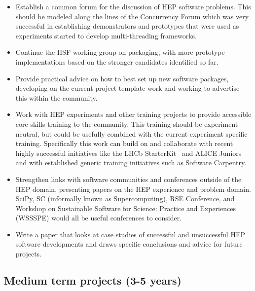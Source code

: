 \documentclass[12pt,a4paper]{article}
\begin{document}
\begin{itemize}
\item
    Establish a common forum for the discussion of HEP software problems.
  This should be modeled along the lines of the Concurrency Forum
  which was very successful in establishing demonstrators and prototypes
  that were used as experiments started to develop multi-threading
  frameworks.
  \item
  Continue the HSF working group on packaging, with more prototype
  implementations based on the stronger candidates identified so far.
  \item
    Provide practical advice on how to best set up new software packages,
  developing on the current project template work and working to
  advertise this within the community.
  \item
    Work with HEP experiments and other training projects to provide
  accessible core skills training to the community. This training should
  be experiment neutral, but could be usefully combined with the current
  experiment specific training. Specifically this work can build on and
  collaborate with recent highly successful initiatives like the LHCb
  StarterKit~\cite{1742-6596-898-8-082054} and ALICE Juniors~\cite{ALICEJuniors}
  and with established generic training initiatives such as Software Carpentry.
  \item
    Strengthen links with software communities and conferences outside of
  the HEP domain, presenting papers on the HEP experience and problem
  domain. SciPy, SC (informally known as Supercomputing), RSE
  Conference, and Workshop on Sustainable Software for Science: Practice
  and Experiences (WSSSPE) would all be useful conferences to consider.
  \item
    Write a paper that looks at case studies of successful and
  unsuccessful HEP software developments and draws specific conclusions
  and advice for future projects.
\end{itemize}

\hypertarget{medium-term-projects-3-5-years}{%
\subsection{Medium term projects (3-5
years)}\label{medium-term-projects-3-5-years}}
\end{document}
